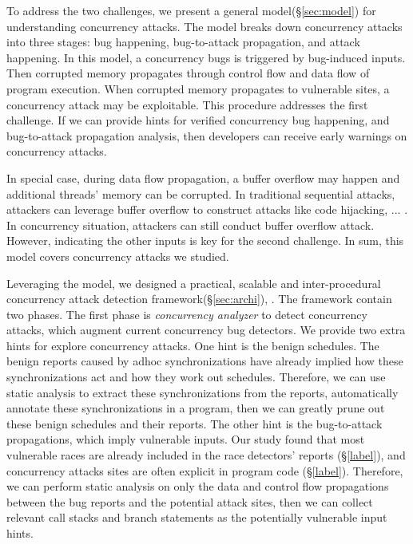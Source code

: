 
To address the two challenges, we present a general model(\S\ref{sec:model}) 
for understanding concurrency attacks.
The model breaks down concurrency attacks into three stages: bug happening, 
bug-to-attack propagation, and attack happening. 
In this model, 
a concurrency bugs is triggered by bug-induced inputs. Then corrupted memory 
propagates through control flow and data flow of program execution. 
When corrupted memory propagates to vulnerable sites, a concurrency attack may be exploitable. 
This procedure addresses the first challenge. If we can provide hints for verified concurrency bug happening, 
and bug-to-attack propagation analysis, 
then developers can receive early warnings on concurrency attacks.

In special case, 
during data flow propagation, a buffer overflow may happen and additional threads' memory can be corrupted.  
In traditional sequential attacks, attackers can leverage buffer overflow to construct attacks like 
code hijacking, ... \cite{}. In concurrency situation, attackers can still conduct buffer overflow attack.  
However, indicating the other inputs is key for the second challenge.   
In sum, this model covers \nattacks concurrency attacks we studied. 


Leveraging the model, we designed a practical, scalable and inter-procedural concurrency 
attack detection framework(\S\ref{sec:archi}), \xxx. 
The framework contain two phases.
The first phase is \emph{concurrency analyzer} to detect concurrency attacks, 
which augment current concurrency bug detectors.  
We provide two extra hints for explore concurrency attacks.
One hint is the benign schedules. The benign reports caused by adhoc
synchronizations have already implied how these synchronizations
act and how they work out schedules. Therefore, we
can use static analysis to extract these synchronizations from
the reports, automatically annotate these synchronizations in
a program, then we can greatly prune out these benign schedules
and their reports. The other hint is the bug-to-attack propagations, which
imply vulnerable inputs. Our study found that most vulnerable
races are already included in the race detectors’ reports
(\S\ref{label}), and concurrency attacks sites are often explicit in program
code (\S\ref{label}). Therefore, we can perform static analysis
on only the data and control flow propagations between the
bug reports and the potential attack sites, then we can collect
relevant call stacks and branch statements as the potentially
vulnerable input hints.

